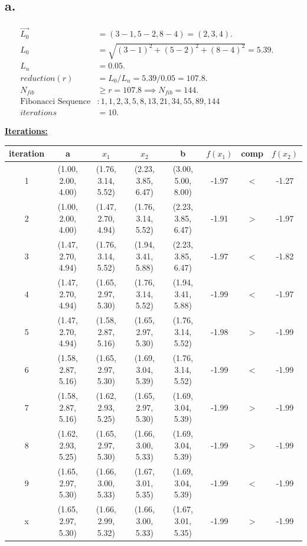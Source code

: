 \documentclass{article}
\begin{document}
\subsection*{a.}

\begin{align*}
 \vec{L_0} &= (3-1, 5-2, 8-4) = (2,3,4). &&\\
 L_0 &= \sqrt{(3-1)^2 + (5-2)^2 + (8-4)^2} = 5.39. &&\\
 L_n &= 0.05. &&\\
 reduction (r) &= L_0 / L_n = 5.39/0.05 = 107.8. &&\\
 N_{fib} &\geq r = 107.8 \implies N_{fib} = 144. &&\\
 \text{Fibonacci Sequence}&: 1, 1, 2, 3, 5, 8, 13, 21, 34, 55, 89, 144
 &&\\
 iterations &= 10.
\end{align*}

\textbf{\underline{Iterations:}}
\newline

\begin{tabular}{ |c|c|c|c|c|c|c|c| }
\hline
iteration & a & $x_1$ & $x_2$ & b & $f(x_1)$ & comp & $f(x_2)$ \\ 
\hline 
1	& (1.00, 2.00, 4.00)	& (1.76, 3.14, 5.52)	& (2.23, 3.85, 6.47)	& (3.00, 5.00, 8.00)	& -1.97	& $<$	& -1.27 \\
\hline 
2	& (1.00, 2.00, 4.00)	& (1.47, 2.70, 4.94)	& (1.76, 3.14, 5.52)	& (2.23, 3.85, 6.47)	& -1.91	& $>$	& -1.97 \\
\hline 
3	& (1.47, 2.70, 4.94)	& (1.76, 3.14, 5.52)	& (1.94, 3.41, 5.88)	& (2.23, 3.85, 6.47)	& -1.97	& $<$	& -1.82 \\
\hline 
4	& (1.47, 2.70, 4.94)	& (1.65, 2.97, 5.30)	& (1.76, 3.14, 5.52)	& (1.94, 3.41, 5.88)	& -1.99	& $<$	& -1.97 \\
\hline 
5	& (1.47, 2.70, 4.94)	& (1.58, 2.87, 5.16)	& (1.65, 2.97, 5.30)	& (1.76, 3.14, 5.52)	& -1.98	& $>$	& -1.99 \\
\hline 
6	& (1.58, 2.87, 5.16)	& (1.65, 2.97, 5.30)	& (1.69, 3.04, 5.39)	& (1.76, 3.14, 5.52)	& -1.99	& $<$	& -1.99 \\
\hline 
7	& (1.58, 2.87, 5.16)	& (1.62, 2.93, 5.25)	& (1.65, 2.97, 5.30)	& (1.69, 3.04, 5.39)	& -1.99	& $>$	& -1.99 \\
\hline 
8	& (1.62, 2.93, 5.25)	& (1.65, 2.97, 5.30)	& (1.66, 3.00, 5.33)	& (1.69, 3.04, 5.39)	& -1.99	& $>$	& -1.99 \\
\hline 
9	& (1.65, 2.97, 5.30)	& (1.66, 3.00, 5.33)	& (1.67, 3.01, 5.35)	& (1.69, 3.04, 5.39)	& -1.99	& $<$	& -1.99 \\
\hline 
x	& (1.65, 2.97, 5.30)	& (1.66, 2.99, 5.32)	& (1.66, 3.00, 5.33)	& (1.67, 3.01, 5.35)	& -1.99	& $>$	& -1.99 \\
\hline
\end{tabular}
\newline
\end{document}
